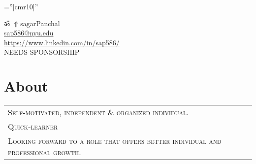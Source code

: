 \documentclass[a4paper]{article}
\newcommand{\apple}{\char"F8FF}
\begin{document}
\pagestyle{empty} 						%
\font\fb=''[cmr10]'' 						%

\par	{\centering
	ॐ
	\href{https://sap586.github.io/LivingSpace/}{$ \Uparrow$}{sagarPanchal}								\\
	\small \href{mailto:sap586@nyu.edu}{sap586@nyu.edu}			
															\\
	\small \href{https://www.linkedin.com/in/sap586/}{https://www.linkedin.com/in/sap586/}				\\
	\small NEEDS SPONSORSHIP																			\par}
	
\section	{	About		}

	\begin{tabular}{lr}
		\textsc{	Self-motivated, independent \& organized individual.									}\\
		\textsc{	Quick-learner																			}\\
		\textsc{	Looking forward to a role that offers better individual and professional growth.		}
	\end{tabular}
	\begin{spacing}{0.4}
	\end{spacing}

	
%
\end{document}
